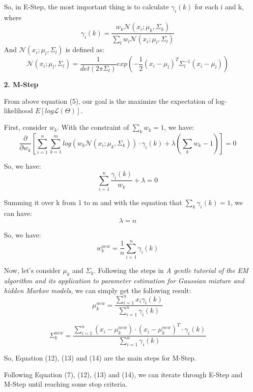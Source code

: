 \begin{description}
So, in E-Step, the most important thing is to calculate $\gamma_i(k)$ for each i and k, where 
\begin{equation}
\gamma_i(k) = \frac{w_k \mathcal{N}(x_i; \mu_k, \Sigma_k)}{\sum_l w_l \mathcal{N}(x_i; \mu_l, \Sigma_l)}
\end{equation}
And $\mathcal{N}(x_i; \mu_l, \Sigma_l)$ is defined as:
\begin{equation}
	\mathcal{N}(x_i; \mu_l, \Sigma_l) = \frac{1}{det(2 \pi \Sigma_l)}exp(-\frac{1}{2}(x_i - \mu_l)^T \Sigma_l^{-1} (x_i - \mu_l))
\end{equation}


\item{\bf \large 2. M-Step}

From above equation (5), our goal is the maximize the expectation of log-likelihood $E[log\mathcal{L}(\Theta)]$.

First, consider $w_k$. With the constraint of $\sum_k w_k = 1$, we have:
\begin{equation}
\frac{\partial}{\partial w_k} [\sum_{i=1}^n \sum_{k=1}^m log(w_k \mathcal{N}(x_i; \mu_k, \Sigma_k))\cdot \gamma_i(k) + \lambda(\sum_k w_k - 1)] = 0
\end{equation}

So, we have: 
\begin{equation}
\sum_{i=1}^n \frac{\gamma_i(k)}{w_k} + \lambda = 0
\end{equation}

Summing it over k from 1 to m and with the equation that $\sum_k \gamma_i(k) = 1$, we can have:
\begin{equation}
\lambda = n
\end{equation}

So, we have:
\begin{equation}
	w_k^{new} = \frac{1}{n} \sum_{i=1}^n \gamma_i(k)
\end{equation}

Now, let's consider $\mu_k$ and $\Sigma_k$. Following the steps in {\it A gentle tutorial of the EM algorithm and its application to parameter estimation for Gaussian mixture and hidden Markov models}, we can simply get the following result:
\begin{equation}
	\mu_k^{new} = \frac{\sum_{i=1}^n x_i \gamma_i(k)}{\sum_{i=1}^n \gamma_i(k)}
\end{equation}


\begin{equation}
	\Sigma_k^{new} = \frac{\sum_{i=1}^n (x_i - \mu_k^{new}) \cdot (x_i - \mu_k^{new})^T \cdot \gamma_i(k)}{\sum_{i=1}^n \gamma_i(k)}
\end{equation}

So, Equation (12), (13) and (14) are the main steps for M-Step.

Following Equation (7), (12), (13) and (14), we can iterate through E-Step and M-Step until reaching some stop criteria.

\end{description}

